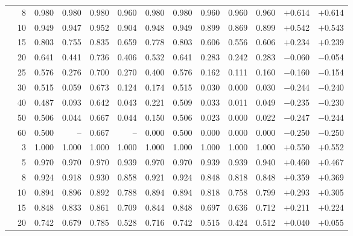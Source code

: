 \documentclass[conference]{IEEEtran}
\theoremstyle{remark}
\begin{document}
\begin{table}[ht]
{\begin{tabular}{p{2.2cm}r rrrr rr rr r rr}
  & 8  & 0.980 & 0.980 & 0.980 & 0.960 & 0.980 & 0.980 & 0.960 & 0.960 & 0.960 & $+$0.614 & $+$0.614 \\
  & 10 & 0.949 & 0.947 & 0.952 & 0.904 & 0.948 & 0.949 & 0.899 & 0.869 & 0.899 & $+$0.542 & $+$0.543 \\
  & 15 & 0.803 & 0.755 & 0.835 & 0.659 & 0.778 & 0.803 & 0.606 & 0.556 & 0.606 & $+$0.234 & $+$0.239 \\
  & 20 & 0.641 & 0.441 & 0.736 & 0.406 & 0.532 & 0.641 & 0.283 & 0.242 & 0.283 & $-$0.060 & $-$0.054 \\
  & 25 & 0.576 & 0.276 & 0.700 & 0.270 & 0.400 & 0.576 & 0.162 & 0.111 & 0.160 & $-$0.160 & $-$0.154 \\
  & 30 & 0.515 & 0.059 & 0.673 & 0.124 & 0.174 & 0.515 & 0.030 & 0.000 & 0.030 & $-$0.244 & $-$0.240 \\
  & 40 & 0.487 & 0.093 & 0.642 & 0.043 & 0.221 & 0.509 & 0.033 & 0.011 & 0.049 & $-$0.235 & $-$0.230 \\
  & 50 & 0.506 & 0.044 & 0.667 & 0.044 & 0.150 & 0.506 & 0.023 & 0.000 & 0.022 & $-$0.247 & $-$0.244 \\
  & 60 & 0.500 & -- & 0.667 & -- & 0.000 & 0.500 & 0.000 & 0.000 & 0.000 & $-$0.250 & $-$0.250 \\
\midrule
{}
  & 3  & 1.000 & 1.000 & 1.000 & 1.000 & 1.000 & 1.000 & 1.000 & 1.000 & 1.000 & $+$0.550 & $+$0.552 \\
  & 5  & 0.970 & 0.970 & 0.970 & 0.939 & 0.970 & 0.970 & 0.939 & 0.939 & 0.940 & $+$0.460 & $+$0.467 \\
  & 8  & 0.924 & 0.918 & 0.930 & 0.858 & 0.921 & 0.924 & 0.848 & 0.818 & 0.848 & $+$0.359 & $+$0.369 \\
  & 10 & 0.894 & 0.896 & 0.892 & 0.788 & 0.894 & 0.894 & 0.818 & 0.758 & 0.799 & $+$0.293 & $+$0.305 \\
  & 15 & 0.848 & 0.833 & 0.861 & 0.709 & 0.844 & 0.848 & 0.697 & 0.636 & 0.712 & $+$0.211 & $+$0.224 \\
  & 20 & 0.742 & 0.679 & 0.785 & 0.528 & 0.716 & 0.742 & 0.515 & 0.424 & 0.512 & $+$0.040 & $+$0.055 \\

\end{tabular}}
\end{table}
\end{document}
